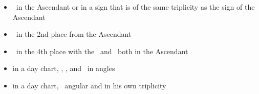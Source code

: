 \begin{itemize}[topsep=0pt,itemsep=0pt]
\item \Jupiter\, in the Ascendant or in a sign that is of the same triplicity as the sign of the Ascendant 

\item \Jupiter\, in the 2nd place from the Ascendant

\item \Jupiter\, in the 4th place with the \Moon\, and \Mercury\, both in the Ascendant

\item in a day chart, \Saturn, \Jupiter, and \Mercury\, in angles

\item in a day chart, \Saturn\, angular and in his own triplicity
\end{itemize}






